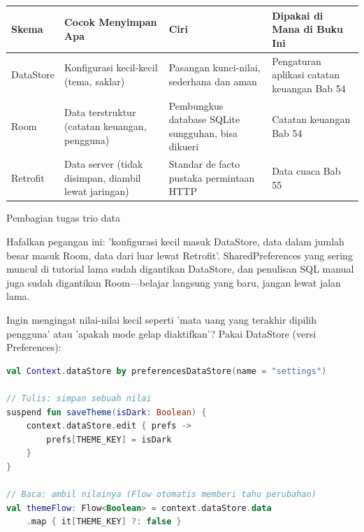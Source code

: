 


\begin{center}
\begin{tabularx}{\linewidth}{|X|X|X|X|}
\hline
\textbf{Skema} & \textbf{Cocok Menyimpan Apa} & \textbf{Ciri} & \textbf{Dipakai di Mana di Buku Ini} \tabularnewline
\hline
DataStore & Konfigurasi kecil-kecil (tema, saklar) & Pasangan kunci-nilai, sederhana dan aman & Pengaturan aplikasi catatan keuangan Bab 54 \tabularnewline
Room & Data terstruktur (catatan keuangan, pengguna) & Pembungkus database SQLite sungguhan, bisa dikueri & Catatan keuangan Bab 54 \tabularnewline
Retrofit & Data server (tidak disimpan, diambil lewat jaringan) & Standar de facto pustaka permintaan HTTP & Data cuaca Bab 55 \tabularnewline
\hline
\end{tabularx}
\end{center}

\begin{center}\small\color{gray}Pembagian tugas trio data\end{center}

Hafalkan pegangan ini: 'konfigurasi kecil masuk DataStore, data dalam jumlah besar masuk Room, data dari luar lewat Retrofit'. SharedPreferences yang sering muncul di tutorial lama sudah digantikan DataStore, dan penulisan SQL manual juga sudah digantikan Room—belajar langsung yang baru, jangan lewat jalan lama.


Ingin mengingat nilai-nilai kecil seperti 'mata uang yang terakhir dipilih pengguna' atau 'apakah mode gelap diaktifkan'? Pakai DataStore (versi Preferences):

\begin{lstlisting}[language=Kotlin]
val Context.dataStore by preferencesDataStore(name = "settings")

// Tulis: simpan sebuah nilai
suspend fun saveTheme(isDark: Boolean) {
    context.dataStore.edit { prefs ->
        prefs[THEME_KEY] = isDark
    }
}

// Baca: ambil nilainya (Flow otomatis memberi tahu perubahan)
val themeFlow: Flow<Boolean> = context.dataStore.data
    .map { it[THEME_KEY] ?: false }
\end{lstlisting}

